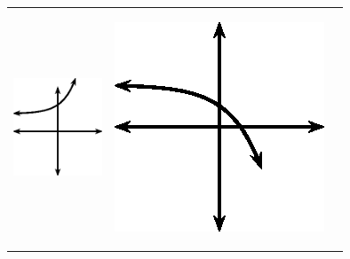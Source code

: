 \begin{center}
\begin{xtabular*}{\mytablewidth}[t]{|p{10\mystarwidth}|p{10\mystarwidth}|p{10\mystarwidth}|}
    
        
                  
    \setcounter{subfigure}{0}

\label{m39348*id250546}
    \begin{center}
    \label{m39348*id250546!!!underscore!!!media}\label{m39348*id250546!!!underscore!!!printimage}\includegraphics[width=100px]{col11306.imgs/m39348_MG10C11_028.png} %
        
      \vspace{2pt}
    \vspace{.1in}
    
    \end{center}



    \addtocounter{footnote}{-0}
    
                 &
    
    
        
                  
    \setcounter{subfigure}{0}

\label{m39348*id250558}
    \begin{center}
    \label{m39348*id250558!!!underscore!!!media}\label{m39348*id250558!!!underscore!!!printimage}\includegraphics[width100px]{col11306.imgs/m39348_MG10C11_029.png} %
        

\end{center}
\end{xtabular*}
\end{center}
